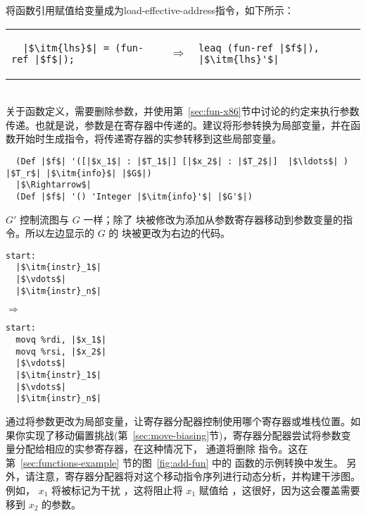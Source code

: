 \documentclass[11pt]{book}
\begin{document}
将函数引用赋值给变量成为load-effective-address指令，如下所示： \\
\begin{tabular}{lcl}
\begin{minipage}{0.35\textwidth}
\begin{lstlisting}
  |$\itm{lhs}$| = (fun-ref |$f$|);
\end{lstlisting}
\end{minipage}
&
$\Rightarrow$\qquad\qquad
&
\begin{minipage}{0.3\textwidth}
\begin{lstlisting}
leaq (fun-ref |$f$|), |$\itm{lhs}'$|
\end{lstlisting}
\end{minipage}
\end{tabular} \\

关于函数定义，需要删除参数，并使用第~\ref{sec:fun-x86}节中讨论的约定来执行参数传递。也就是说，参数是在寄存器中传递的。建议将形参转换为局部变量，并在函数开始时生成指令，将传递寄存器的实参转移到这些局部变量。
\begin{lstlisting}
  (Def |$f$| '([|$x_1$| : |$T_1$|] [|$x_2$| : |$T_2$|]  |$\ldots$| ) |$T_r$| |$\itm{info}$| |$G$|)
  |$\Rightarrow$|
  (Def |$f$| '() 'Integer |$\itm{info}'$| |$G'$|)
\end{lstlisting}
 $G'$ 控制流图与 $G$ 一样；除了
 块被修改为添加从参数寄存器移动到参数变量的指令。所以左边显示的 $G$ 的 
块被更改为右边的代码。
\begin{center}
\begin{minipage}{0.3\textwidth}
\begin{lstlisting}
start:
  |$\itm{instr}_1$|
  |$\vdots$|
  |$\itm{instr}_n$|
\end{lstlisting}
\end{minipage}
$\Rightarrow$
\begin{minipage}{0.3\textwidth}
\begin{lstlisting}
start:
  movq %rdi, |$x_1$|
  movq %rsi, |$x_2$|
  |$\vdots$|
  |$\itm{instr}_1$|
  |$\vdots$|
  |$\itm{instr}_n$|
\end{lstlisting}
\end{minipage}
\end{center}
通过将参数更改为局部变量，让寄存器分配器控制使用哪个寄存器或堆栈位置。如果你实现了移动偏置挑战(第~\ref{sec:move-biasing}节)，寄存器分配器尝试将参数变量分配给相应的实参寄存器，在这种情况下， 通道将删除
 指令。这在第~\ref{sec:functions-example}
节的图~\ref{fig:add-fun} 中的  函数的示例转换中发生。
%
另外，请注意，寄存器分配器将对这个移动指令序列进行动态分析，并构建干涉图。例如， $x_1$ 将被标记为干扰
 ，这将阻止将 $x_1$ 赋值给
 ，这很好，因为这会覆盖需要移到 $x_2$ 的参数。
\end{document}
